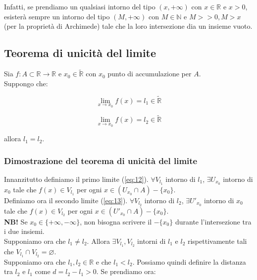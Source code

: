 \documentclass{article}
\begin{document}
\noindent Infatti, se prendiamo un qualsiasi intorno del tipo $(x, +\infty)$ con $x \in \mathbb{R}$ e $x > 0$, esisterà sempre un intorno del tipo $(M, +\infty)$ con $M \in \mathbb{N}$ e $M >> 0, M > x$ (per la proprietà di Archimede) tale che la loro intersezione dia un insieme vuoto.

\subsection{Teorema di unicità del limite}
Sia $f: A \subset \mathbb{R} \xrightarrow{} \mathbb{R}$ e $x_0 \in \widetilde{\mathbb{R}}$ con $x_0$ punto di accumulazione per $A$.\\
Suppongo che:

\begin{equation}
    \lim_{x\to x_0}f(x) = l_1 \in \widetilde{\mathbb{R}}
    \label{eq:12}
\end{equation}

\begin{equation}
    \lim_{x\to x_0}f(x) = l_2 \in \widetilde{\mathbb{R}}
    \label{eq:13}
\end{equation}

\noindent allora $l_1 = l_2$.

\subsubsection{Dimostrazione del teorema di unicità del limite}
Innanzitutto definiamo il primo limite (\ref{eq:12}). $\forall V_{l_1}$ intorno di $l_1$, $\exists U_{x_0}$ intorno di $x_0$ tale che $f(x) \in V_{l_1}$ per ogni $x \in (U_{x_0} \cap A) - \{x_0\}$.\\
Definiamo ora il secondo limite (\ref{eq:13}). $\forall V_{l_2}$ intorno di $l_2$, $\exists U'_{x_0}$ intorno di $x_0$ tale che $f(x) \in V_{l_2}$ per ogni $x \in (U'_{x_0} \cap A) - \{x_0\}$.\\

\noindent\textbf{NB!} Se $x_0 \in \{+\infty, -\infty\}$, non bisogna scrivere il $- \{x_0\}$ durante l'intersezione tra i due insiemi.\\

\noindent Supponiamo ora che $l_1 \neq l_2$. Allora $\exists V_{l_1}, V_{l_2}$ intorni di $l_1$ e $l_2$ rispettivamente tali che $V_{l_1} \cap V_{l_2} = \varnothing$.\\
Supponiamo ora che $l_1, l_2 \in \mathbb{R}$ e che $l_1 < l_2$. Possiamo quindi definire la distanza tra $l_2$ e $l_1$ come $d = l_2 - l_1 > 0$. Se prendiamo ora:
\end{document}
